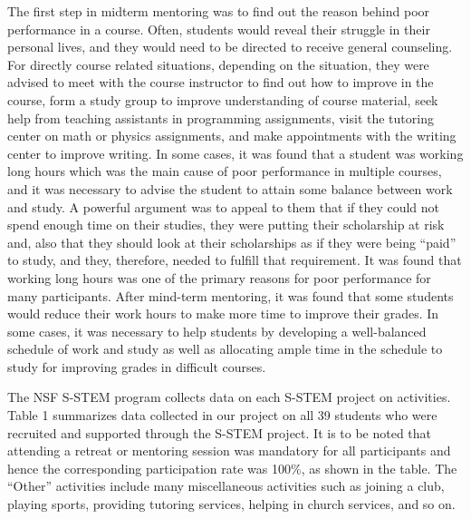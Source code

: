 \documentclass{article}
\begin{document}
The first step in midterm mentoring was to find out the reason behind poor performance in a course. Often, students would reveal their struggle in their personal lives, and they would need to be directed to receive general counseling. For directly course related situations, depending on the situation, they were advised to meet with the course instructor to find out how to improve in the course, form a study group to improve understanding of course material, seek help from teaching assistants in programming assignments, visit the tutoring center on math or physics assignments, and make appointments with the writing center to improve writing. In some cases, it was found that a student was working long hours which was the main cause of poor performance in multiple courses, and it was necessary to advise the student to attain some balance between work and study. A powerful argument was to appeal to them that if they could not spend enough time on their studies, they were putting their scholarship at risk and, also that they should look at their scholarships as if they were being “paid” to study, and they, therefore, needed to fulfill that requirement. It was found that working long hours was one of the primary reasons for poor performance for many participants. After mind-term mentoring, it was found that some students would reduce their work hours to make more time to improve their grades. In some cases, it was necessary to help students by developing a well-balanced schedule of work and study as well as allocating ample time in the schedule to study for improving grades in difficult courses.

The NSF S-STEM program collects data on each S-STEM project on activities. Table 1 summarizes data collected in our project on all 39 students who were recruited and supported through the S-STEM project. It is to be noted that attending a retreat or mentoring session was mandatory for all participants and hence the corresponding participation rate was 100\%, as shown in the table. The “Other” activities include many miscellaneous activities such as joining a club, playing sports, providing tutoring services, helping in church services, and so on.
\end{document}
